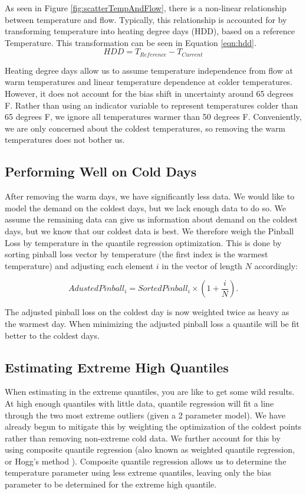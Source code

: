 \documentclass{article}
\begin{document}
As seen in Figure \ref{fig:scatterTempAndFlow}, there is a non-linear relationship between temperature and flow. Typically, this relationship is accounted for by transforming temperature into heating degree days (HDD), based on a reference Temperature. This transformation can be seen in Equation \ref{eqn:hdd}. 
\begin{equation}
    HDD= T_{Reference}-T_{Current}
    \label{eqn:hdd}
\end{equation}

Heating degree days allow us to assume temperature independence from flow at warm temperatures and linear temperature dependence at colder temperatures. However, it does not account for the bias shift in uncertainty around 65 degrees F. Rather than using an indicator variable to represent temperatures colder than 65 degrees F, we ignore all temperatures warmer than 50 degrees F. Conveniently, we are only concerned about the coldest temperatures, so removing the warm temperatures does not bother us.

\subsection{Performing Well on Cold Days}

After removing the warm days, we have significantly less data. We would like to model the demand on the coldest days, but we lack enough data to do so. We assume the remaining data can give us information about demand on the coldest days, but we know that our coldest data is best. We therefore weigh the Pinball Loss by temperature in the quantile regression optimization. This is done by sorting pinball loss vector by temperature (the first index is the warmest temperature) and adjusting each element $i$ in the vector of length $N$ accordingly:

\begin{equation}
    AdustedPinball_i = SortedPinball_i \times (1 + \frac{i}{N}).
\end{equation}

The adjusted pinball loss on the coldest day is now weighted twice as heavy as the warmest day. When minimizing the adjusted pinball loss a quantile will be fit better to the coldest days.


\subsection{Estimating Extreme High Quantiles}

When estimating in the extreme quantiles, you are like to get some wild results. At high enough quantiles with little data, quantile regression will fit a line through the two most extreme outliers (given a 2 parameter model). We have already begun to mitigate this by weighting the optimization of the coldest points rather than removing non-extreme cold data. We further account for this by using composite quantile regression (also known as weighted quantile regression, or Hogg's method \cite{}). Composite quantile regression allows us to determine the temperature parameter using less extreme quantiles, leaving only the bias parameter to be determined for the extreme high quantile.
\end{document}

